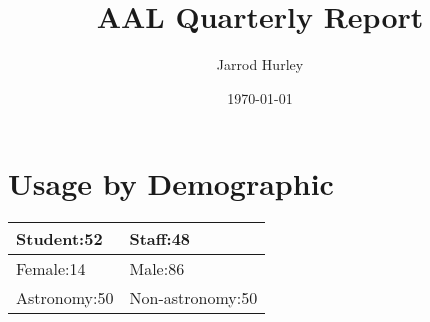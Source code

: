 \documentclass{article}%
\title{AAL Quarterly Report}%
\author{Jarrod Hurley}%
\date{\today}%
\begin{document}
%
\normalsize%
\maketitle%
\newpage%
\section{Usage by Demographic}%

%
\begin{longtabu}{X[l] X[l]}%
Student:52&Staff:48\\%
\hline%
Female:14&Male:86\\%
\hline%
Astronomy:50&Non{-}astronomy:50\\%
\hline%
\end{longtabu}%
\end{document}
